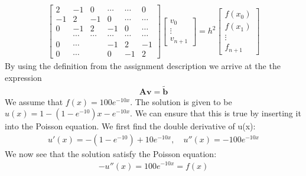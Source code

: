 \documentclass[american,a4paper,12pt]{article}
\renewcommand{\vec}[1]{\mathbf{#1}} %
\begin{document}
\begin{align*}
      \begin{bmatrix}
        2 & -1 & 0 & \cdots & \cdots & 0 \\
        -1 & 2 & -1 & 0 & \cdots & \cdots \\
        0 & -1 & 2 & -1 & 0 & \cdots \\
         & \cdots & \cdots & \cdots & \cdots & \cdots \\
        0 & \cdots & & -1 & 2 & -1 \\
        0 & \cdots & & 0 & -1 & 2
      \end{bmatrix}
      \begin{bmatrix}
        v_0 \\
        \vdots \\
        v_{n+1}
      \end{bmatrix}
= h^2
      \begin{bmatrix}
        f(x_0) \\
        f(x_1) \\
        \vdots \\
        f_{n+1}
      \end{bmatrix}
\end{align*}
By using the definition from the assignment description we arrive at the the expression
\begin{align*}
  \vec{A}\vec{v} = \vec{\tilde{b}}
\end{align*}
We assume that $f(x) = 100e^{-10x}$. The solution is given to be $u(x) = 1 - (1 - e^{-10})x - e^{-10x}$. We can ensure that this is true by inserting it into the Poisson equation. We first find the double derivative of u(x):
\begin{align*}
  u'(x) = -(1 - e^{-10}) + 10e^{-10x}, \quad u''(x) = -100e^{-10x}
\end{align*}
We now see that the solution satisfy the Poisson equation:
\begin{align*}
  -u''(x) = 100e^{-10x} = f(x)
\end{align*}
\end{document}
